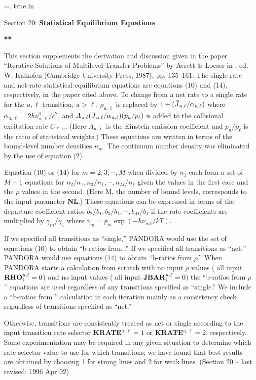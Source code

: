 %
\newtoks\footline \footline={\hss{}.\folio\hss}
%
%
\top
{} true in
\centerline{Section 20: {\bf Statistical Equilibrium Equations}}
\blankline
\blankline
\centerline{\bf ***}
\blankline
\blankline
This section supplements the derivation and discussion given in the paper
``Iterative Solutions of Multilevel Transfer Problems'' by Avrett \& Loeser in
, ed. W. Kalkofen (Cambridge University
Press, 1987), pp. 135--161.
\blankline
The single-rate and net-rate statistical equilibrium equations are equations
(10) and (14), respectively, in the paper cited above. To change from a net rate
to a single rate for the $u,\ell$ transition, $u > \ell$, $\rho_{u,\ell}$ is
replaced by $1 + (\Jbar_{u,\ell}/\alpha_{u,\ell})$ where $\alpha_{u,\ell}
= 2 h \nu^3_{u,\ell} / c^2$, and $A_{u,\ell} (\Jbar_{u,\ell}/\alpha_{u,\ell})
(p_u/p_\ell)$ is added to the collisional excitation rate $C_{\ell,u}$. 
(Here $A_{u,\ell}$ is the Einstein emission coefficient and $p_u/p_\ell$
is the ratio of statistical weights.) These equations are written in terms
of the bound-level number densities $n_m$. The continuum number density
was eliminated by the use of equation (2).

Equation (10) or (14) for $m = 2, 3, \cdots , M$ 
when divided by $n_1$ each form a set of $M-1$ equations
for $n_2/n_1, n_3/n_1, \cdots , n_M/n_1$ given the {\Jbar} values in the
first case and the $\rho$ values in the second. (Here M, the number of bound
levels, corresponds to the input parameter {\bf NL}.) These equations can be
expressed in terms of the departure coefficient ratios $b_2/b_1, 
b_3/b_1, \cdots , b_M/b_1$ if the rate coefficients are multiplied by
$\gamma_m/\gamma_1$ where $\gamma_m = p_m \exp(-h\nu_{m1}/{kT})$.

If we specified all transitions as ``single,'' PANDORA would use the set of
equations (10) to obtain ``b-ratios from {\Jbar}.'' If we specified all
transitions as ``net,'' PANDORA would use equations (14) to obtain ``b-ratios
from $\rho$.'' When PANDORA starts a calculation from scratch with no
input $\rho$ values ({\ie} all input ${\bf RHO}^{u,\ell}_i = 0$) and no input
{\Jbar} values ({\ie} all input ${\bf JBAR}^{u,\ell}_i = 0$)
the ``b-ratios from $\rho$'' equations are used regardless of
any transitions specified as ``single.'' We include a ``b-ratios from
{\Jbar}'' calculation in each iteration mainly as a consistency check
regardless of transitions specified as ``net.''

Otherwise, transitions are consistently treated as net or single according
to the input transition rate selector {\bf KRATE}$^{u,\ell} = 1$ or
{\bf KRATE}$^{u,\ell} = 2$, respectively. Some experimentation may be
required in any given situation to determine which rate selector value to
use for which transitions; we have found that best results are obtained by
choosing 1 for strong lines and 2 for weak lines.
\vfill
\noindent (Section 20 -- last revised: 1996 Apr 02)%
{}
\ej
